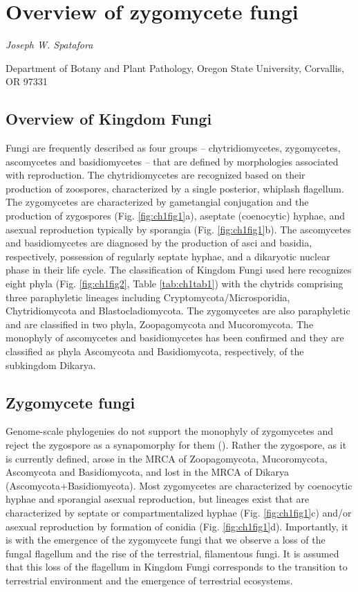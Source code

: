 \documentclass[]{book}
\begin{document}
\hypertarget{intro}{%
\chapter{Overview of zygomycete fungi}\label{intro}}

\emph{Joseph W. Spatafora}

Department of Botany and Plant Pathology, Oregon State University, Corvallis, OR 97331

\hypertarget{overview-of-kingdom-fungi}{%
\section{Overview of Kingdom Fungi}\label{overview-of-kingdom-fungi}}

Fungi are frequently described as four groups -- chytridiomycetes, zygomycetes, ascomycetes and basidiomycetes -- that are defined by morphologies associated with reproduction. The chytridiomycetes are recognized based on their production of zoospores, characterized by a single posterior, whiplash flagellum. The zygomycetes are characterized by gametangial conjugation and the production of zygospores (Fig. \ref{fig:ch1fig1}a), aseptate (coenocytic) hyphae, and asexual reproduction typically by sporangia (Fig. \ref{fig:ch1fig1}b). The ascomycetes and basidiomycetes are diagnosed by the production of asci and basidia, respectively, possession of regularly septate hyphae, and a dikaryotic nuclear phase in their life cycle. The classification of Kingdom Fungi used here recognizes eight phyla (Fig. \ref{fig:ch1fig2}, Table \ref{tab:ch1tab1}) with the chytrids comprising three paraphyletic lineages including Cryptomycota/Microsporidia, Chytridiomycota and Blastocladiomycota. The zygomycetes are also paraphyletic and are classified in two phyla, Zoopagomycota and Mucoromycota. The monophyly of ascomycetes and basidiomycetes has been confirmed and they are classified as phyla Ascomycota and Basidiomycota, respectively, of the subkingdom Dikarya.

\hypertarget{zygomycete-fungi}{%
\section{Zygomycete fungi}\label{zygomycete-fungi}}

Genome-scale phylogenies do not support the monophyly of zygomycetes and reject the zygospore as a synapomorphy for them (\citet{Spatafora_2016}). Rather the zygospore, as it is currently defined, arose in the MRCA of Zoopagomycota, Mucoromycota, Ascomycota and Basidiomycota, and lost in the MRCA of Dikarya (Ascomycota+Basidiomycota). Most zygomycetes are characterized by coenocytic hyphae and sporangial asexual reproduction, but lineages exist that are characterized by septate or compartmentalized hyphae (Fig. \ref{fig:ch1fig1}c) and/or asexual reproduction by formation of conidia (Fig. \ref{fig:ch1fig1}d). Importantly, it is with the emergence of the zygomycete fungi that we observe a loss of the fungal flagellum and the rise of the terrestrial, filamentous fungi. It is assumed that this loss of the flagellum in Kingdom Fungi corresponds to the transition to terrestrial environment and the emergence of terrestrial ecosystems.
\end{document}
